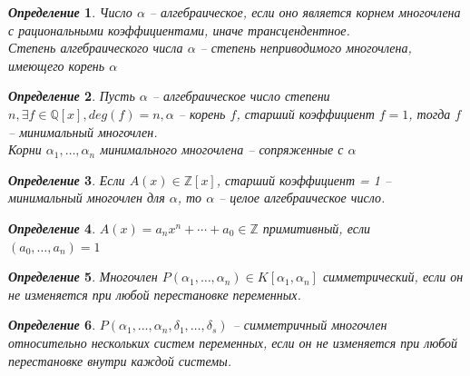 \documentclass[a4paper,12pt]{article}
\newtheorem{deff2}{\textit{Определение}}
\newcommand{\AL}{\alpha}
\newcommand{\bb}[1]{\mathbb{#1}}
\begin{document}
\begin{formbox}{}
\begin{deff2} Число $\AL$ -- алгебраическое, если оно является корнем многочлена с рациональными коэффициентами, иначе трансцендентное.\\
Степень алгебраического числа $\AL$ -- степень неприводимого многочлена, имеющего корень $\AL$
\end{deff2}
\end{formbox}
\begin{formbox}{}
\begin{deff2} Пусть $\AL$ -- алгебраическое число степени $n, \exists f\in\bb{Q}[x], deg(f) = n, \AL$ -- корень $f$, старший коэффициент $f = 1$, тогда $f$ -- минимальный многочлен.\\
Корни $\AL_1,\dots,\AL_n$ минимального многочлена -- сопряженные с $\AL$ 
\end{deff2}
\end{formbox}
\begin{formbox}{}
\begin{deff2} Если $A(x)\in\bb{Z}[x]$, старший коэффициент = 1 -- минимальный многочлен для $\AL$, то $\AL$ -- целое алгебраическое число.
\end{deff2}
\end{formbox}
\begin{formbox}{}
\begin{deff2} $A(x) = a_nx^n + \cdots + a_0\in\bb{Z}$ примитивный, если $(a_0,\dots,a_n) = 1$
\end{deff2}
\end{formbox}
\begin{formbox}{}
\begin{deff2} Многочлен $P(\AL_1,\dots,\AL_n) \in K[\AL_1, \AL_n]$ симметрический, если он не изменяется при любой перестановке переменных.
\end{deff2}
\end{formbox}
\begin{formbox}{}
\begin{deff2} $P(\AL_1, \dots, \AL_n, \delta_1,\dots,\delta_s)$ -- симметричный многочлен относительно нескольких систем переменных, если он не изменяется при любой перестановке внутри каждой системы.
\end{deff2}
\end{formbox}

\newpage
\end{document}
